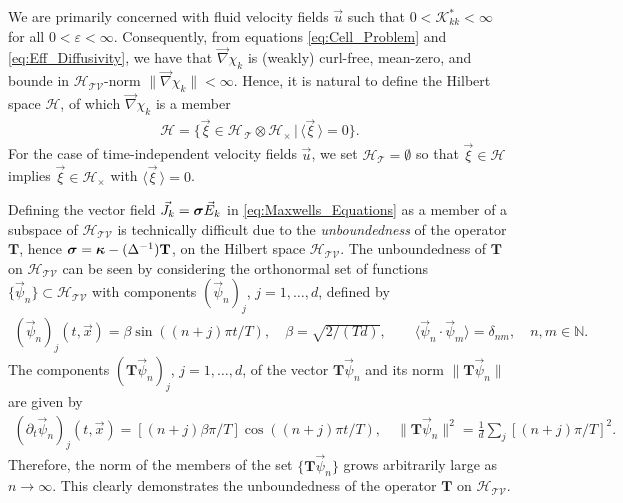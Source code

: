 \documentclass[11pt]{amsart}
\newcommand{\Tb}{\mathbf{T}}
\newcommand{\Kc}{\mathcal{K}}
\newcommand{\Tc}{\mathcal{T}}
\newcommand{\Vc}{\mathcal{V}}
\newcommand{\Hs}{\mathscr{H}}
\newcommand\bsig{\mbox{\boldmath${\sigma}$}}
\newcommand\bkappa{\mbox{\boldmath${\kappa}$}}
\begin{document}
We are primarily concerned with fluid velocity fields $\vec{u}$ such
that $0<\Kc^*_{kk}<\infty$ for all $0<\varepsilon<\infty$. Consequently, from equations
\eqref{eq:Cell_Problem} and \eqref{eq:Eff_Diffusivity}, we have that
$\vec{\nabla}\chi_k$ is (weakly) curl-free, mean-zero, and bounde in
$\Hs_{\Tc\Vc}$-norm $\|\vec{\nabla}\chi_k\|<\infty$. Hence, it is natural to define
the Hilbert space $\Hs$, of which $\vec{\nabla}\chi_k$ is a member 
%
\begin{align}\label{eq:Hilbert_Space}
  \Hs=\{\vec{\xi}\in\Hs_{\,\Tc}\otimes\Hs_\times\,|\, \langle\vec{\xi}\,\rangle=0\}.
\end{align}
%
For the case of time-independent velocity fields
$\vec{u}$, we set $\mathscr{H}_{\Tc}=\emptyset$ so that $\vec{\xi}\in\mathscr{H}$
implies $\vec{\xi}\in\mathscr{H}_\times$ with $\langle\vec{\xi}\,\rangle=0$. 




Defining the vector field $\vec{J}_k=\bsig\vec{E}_k$ in
\eqref{eq:Maxwells_Equations} as a member of a subspace of
$\Hs_{\Tc\Vc}$ is technically difficult due to the
\emph{unboundedness} of the operator $\Tb$, hence
$\bsig=\bkappa-(\Delta^{-1})\Tb$, on the Hilbert space $\Hs_{\Tc\Vc}$. The
unboundedness  
of $\Tb$ on $\Hs_{\Tc\Vc}$ can be seen by considering the orthonormal set of
functions $\{\vec{\psi}_n\}\subset\Hs_{\Tc\Vc}$ with components $(\vec{\psi}_n)_j$,
$j=1,\ldots,d$, defined by 
%
\begin{align}\label{eq:Orthonormal}
  (\vec{\psi}_n)_j(t,\vec{x})=\beta\sin((n+j)\pi t/T), \quad
  \beta=\sqrt{2/(Td)},
  \qquad
  \langle\vec{\psi}_n\cdot\vec{\psi}_m\rangle=\delta_{nm}, \quad
  n,m\in\mathbb{N}.
\end{align}
%
The components $(\Tb\vec{\psi}_n)_j$, $j=1,\ldots,d$, of the vector
$\Tb\vec{\psi}_n$ and its norm $\|\Tb\vec{\psi}_n\|$ are given by
%
\begin{align}\label{eq:Orthonormal_Diff}
  (\partial_t\vec{\psi}_n)_j(t,\vec{x})=[(n+j)\beta\pi/T]\cos((n+j)\pi t/T),\quad
  \|\Tb\vec{\psi}_n\|^2%
               =\frac{1}{d}\sum_j[(n+j)\pi/T]^2.
\end{align}
%
Therefore, the norm of the members of the set $\{\Tb\vec{\psi}_n\}$
grows arbitrarily large as $n\to\infty$. This clearly demonstrates the
unboundedness of the operator $\Tb$ on $\Hs_{\Tc\Vc}$.
\end{document}

